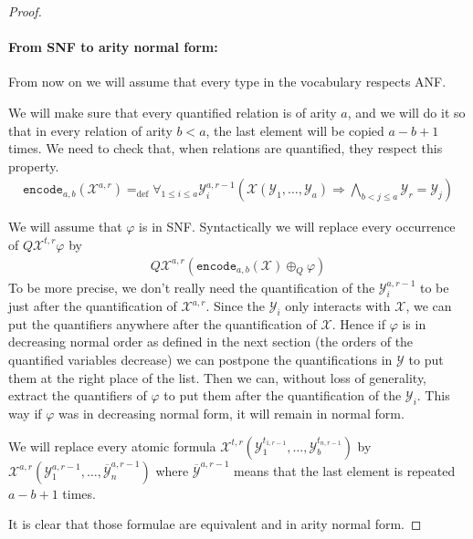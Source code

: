 \documentclass[a4paper,12pt]{article}
\theoremstyle{definition}
\renewcommand{\phi}{\varphi}
\newcommand{\mc}{\mathcal}
\newcommand{\olmc}[1]{\overline{\mathcal{#1}}}
\newcommand{\ed}{=_{\mathrm{def}}}
\begin{document}
\begin{proof}
\paragraph{From SNF to arity normal form:}
From now on we will assume that every type in the vocabulary respects
ANF.

We will make sure that every quantified relation is of arity $a$, and
we will do it so that in every relation of arity $b<a$, the last
element will be copied $a-b+1$ times. We need to check that, when
relations are quantified, they respect this property.
\begin{eqnarray*}
  \texttt{encode}_{a,b}(\mc X^{a,r})\ed\forall_{1\le i\le a}\mc Y_{i}^{a,r-1}(\mc X(\mc Y_{1},\dots,\mc Y_{a})\Rightarrow \bigwedge_{b<j\le a}\mc Y_{r}=\mc Y_{j} )
\end{eqnarray*}





We will assume that $\phi$ is in SNF.  Syntactically we will replace
every occurrence of $Q \mc X^{t,r}\phi$ by
\begin{eqnarray}
  Q \mc X^{a,r}(\texttt{encode}_{a,b}(\mc X) \oplus_{Q} \phi)
\end{eqnarray}
To be more precise, we don't really need the quantification of the
$\mc Y_{i}^{a,r-1}$ to be just after the quantification of $\mc
X^{a,r}$. Since the $\mc Y_{i}$ only interacts with $\mc X$, we can
put the quantifiers anywhere after the quantification of $\mc
X$. Hence if $\phi$ is in decreasing normal
order as defined in the next section (the orders of the quantified variables
decrease) we can postpone the quantifications in $\mc Y$ to put them at
the right place of the list. Then we can, without loss of generality,
extract the quantifiers of $\phi$ to put them after the quantification
of the $\mc Y_{i}$. This way if $\phi$ was in decreasing normal form,
it will remain in normal form.

We will replace every atomic formula $\mc X^{t,r}(\mc
Y_{1}^{t_{1,r-1}},\dots,\mc Y_{b}^{t_{n,r-1}})$ by $\mc X^{a,r}(\mc
Y_{1}^{a,r-1},\dots,\olmc Y_{n}^{a,r-1})$ where $\olmc Y^{a,r-1}$
means that the last element is repeated $a-b+1$ times.

It is clear that those formulae are equivalent and in arity normal
form.





\end{proof}
\end{document}
